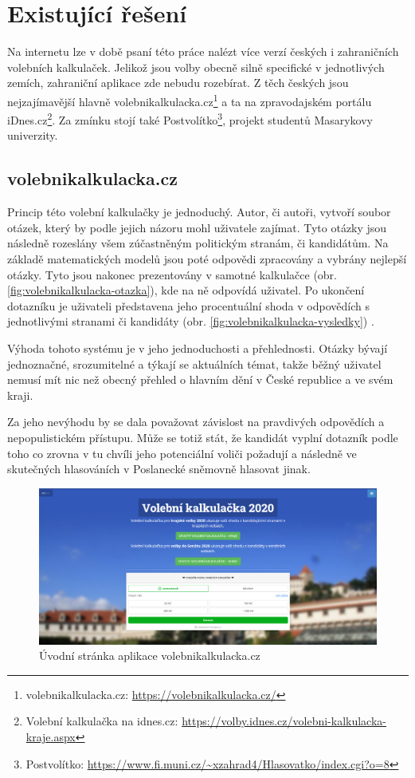 \section{Existující řešení}
Na internetu lze v době psaní této práce nalézt více verzí českých i zahraničních volebních kalkulaček. Jelikož jsou volby obecně silně specifické v jednotlivých zemích, zahraniční aplikace zde nebudu rozebírat. Z těch českých jsou nejzajímavější hlavně volebnikalkulacka.cz\footnote{volebnikalkulacka.cz: \url{https://volebnikalkulacka.cz/}} a ta na zpravodajském portálu iDnes.cz\footnote{Volební kalkulačka na idnes.cz: \url{https://volby.idnes.cz/volebni-kalkulacka-kraje.aspx}}. Za zmínku stojí také Postvolítko\footnote{Postvolítko: \url{https://www.fi.muni.cz/~xzahrad4/Hlasovatko/index.cgi?o=8}}, projekt studentů Masarykovy univerzity. 

\subsection{volebnikalkulacka.cz}
Princip této volební kalkulačky  je jednoduchý. Autor, či autoři, vytvoří soubor otázek, který by podle jejich názoru mohl uživatele zajímat. Tyto otázky jsou následně rozeslány všem zúčastněným politickým stranám, či kandidátům. Na základě matematických modelů jsou poté odpovědi zpracovány a vybrány nejlepší otázky. Tyto jsou nakonec prezentovány v samotné kalkulačce (obr. \ref{fig:volebnikalkulacka-otazka}), kde na ně odpovídá uživatel. Po ukončení dotazníku je uživateli představena jeho procentuální shoda v odpovědích s jednotlivými stranami či kandidáty (obr. \ref{fig:volebnikalkulacka-vysledky}) \cite{volebnikalkulacka-info}.
\par Výhoda tohoto systému je v jeho jednoduchosti a přehlednosti. Otázky bývají jednoznačné, srozumitelné a týkají se aktuálních témat, takže běžný uživatel nemusí mít nic než obecný přehled o hlavním dění v České republice a ve svém kraji. 
\par Za jeho nevýhodu by se dala považovat závislost na pravdivých odpovědích a nepopulistickém přístupu. Může se totiž stát, že kandidát vyplní dotazník podle toho co zrovna v tu chvíli jeho potenciální voliči požadují a následně ve skutečných hlasováních v Poslanecké sněmovně hlasovat jinak.
\\

\begin{figure}
    \centering
    \includegraphics[width=1\textwidth]{obrazky-figures/volebnikalkulackacz-uvod.png}
    \caption{Úvodní stránka aplikace volebnikalkulacka.cz}
    \label{fig:volebnikalkulacka-uvod}
\end{figure}

